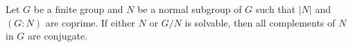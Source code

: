 \begin{theorem}
	\label{thm:SchurZassenhaus:conjugacion}
	Let $G$ be a finite group and $N$ be a normal subgroup of $G$ such that $|N|$ and 
	$(G:N)$ are coprime. If either $N$ or $G/N$ is solvable, then all complements of $N$ in $G$ 
	are conjugate. 
\end{theorem}

%
%
%

